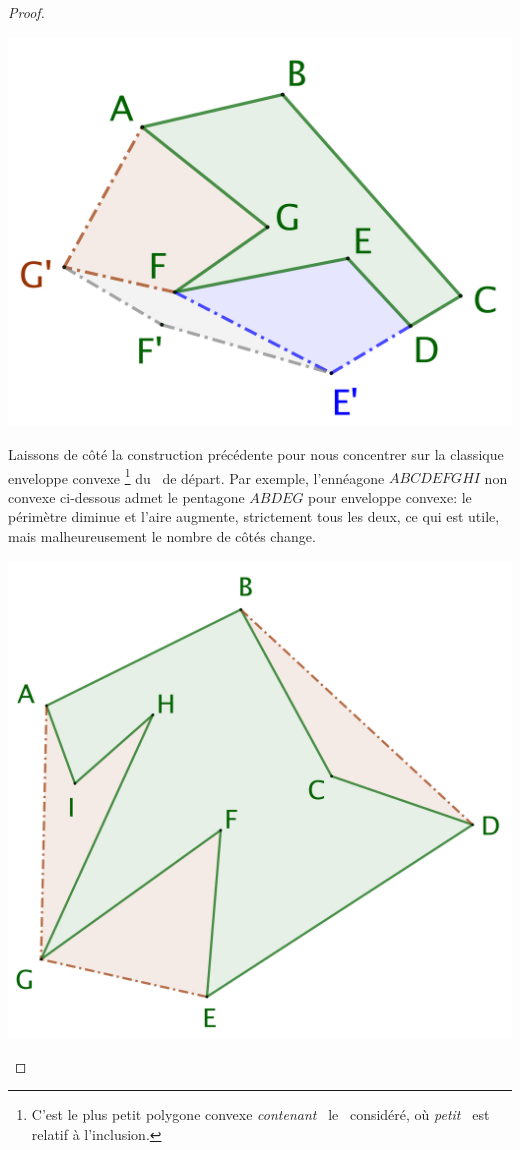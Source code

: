 \begin{proof}
	\begin{center}
		\includegraphics[scale=.4]{content/polygon/polygon-non-convex-bad.png}
	\end{center}


	Laissons de côté la construction précédente pour nous concentrer sur la classique enveloppe convexe%
	\footnote{
		C'est le plus petit polygone convexe \og \emph{contenant} \fg\ le \ngone\ considéré, où \og \emph{petit} \fg\ est relatif à l'inclusion.
	}
	du \ngone\ de départ.
	Par exemple, l'ennéagone $ABCDEFGHI$ non convexe ci-dessous admet le pentagone $ABDEG$ pour enveloppe convexe: le périmètre diminue et l'aire augmente, strictement tous les deux, ce qui est utile, mais malheureusement le nombre de côtés change.
	
	\begin{center}
		\includegraphics[scale=.4]{content/polygon/polygon-convex-hull.png}
	\end{center}


\end{proof}
